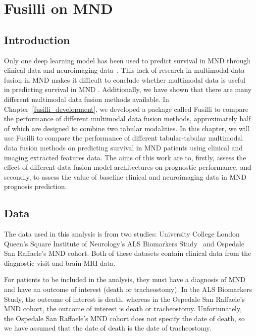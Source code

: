 \chapter{Fusilli on MND}
\label{fusilli_on_mnd}

\section{Introduction}
Only one deep learning model has been used to predict survival in MND through clinical data and neuroimaging data~\cite{vanderburghDeepLearningPredictions2017}.
This lack of research in multimodal data fusion in MND makes it difficult to conclude whether multimodal data is useful in predicting survival in MND .
Additionally, we have shown that there are many different multimodal data fusion methods available.
In Chapter~\ref{fusilli_development}, we developed a package called Fusilli to compare the performance of different multimodal data fusion methods, approximately half of which are designed to combine two tabular modalities.
In this chapter, we will use Fusilli to compare the performance of different tabular-tabular multimodal data fusion methods on predicting survival in MND patients using clinical and imaging extracted features data.
The aims of this work are to, firstly, assess the effect of different data fusion model architectures on prognostic performance, and secondly, to assess the value of baseline clinical and neuroimaging data in MND prognosis prediction.

\section{Data}

The data used in this analysis is from two studies: University College London Queen's Square Institute of Neurology's ALS Biomarkers Study~\cite{UKMNDCSG} and Ospedale San Raffaele's MND cohort.
Both of these datasets contain clinical data from the diagnostic visit and brain MRI data.

For patients to be included in the analysis, they must have a diagnosis of MND and have an outcome of interest (death or tracheostomy).
In the ALS Biomarkers Study, the outcome of interest is death, whereas in the Ospedale San Raffaele's MND cohort, the outcome of interest is death or tracheostomy.
Unfortunately, the Ospedale San Raffaele's MND cohort does not specify the date of death, so we have assumed that the date of death is the date of tracheostomy.

